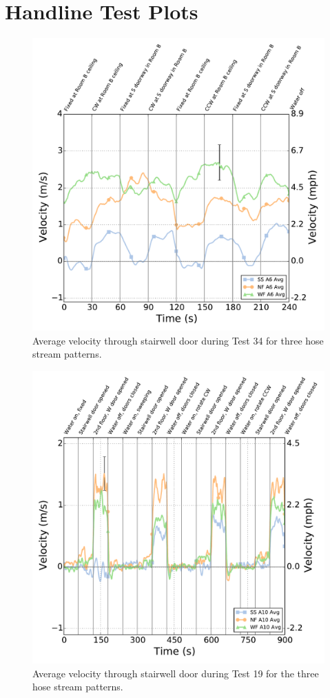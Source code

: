 \documentclass[12pt,oneside]{book}
\begin{document}
\chapter{Handline Test Plots}
\label{chap:handline_plots}

\begin{figure}[!ht]
	\includegraphics[width=0.86\columnwidth]{../Figures/Plots/HOSE_IXAOXX_BDP_A6_stream_avgs}
	\caption{Average velocity through stairwell door during Test 34 for three hose stream patterns.}
	\label{fig:Test_34_BDP_A6_Avg_All}
\end{figure}
\FloatBarrier

\begin{figure}[!ht]
	\includegraphics[width=\columnwidth]{../Figures/Plots/Test_19_West_063014_BDP_A10_stream_avgs}
	\caption{Average velocity through stairwell door during Test 19 for the three hose stream patterns.}
	\label{fig:Test_19_BDP_A10_Avg_All}
\end{figure}

\clearpage
\end{document}
